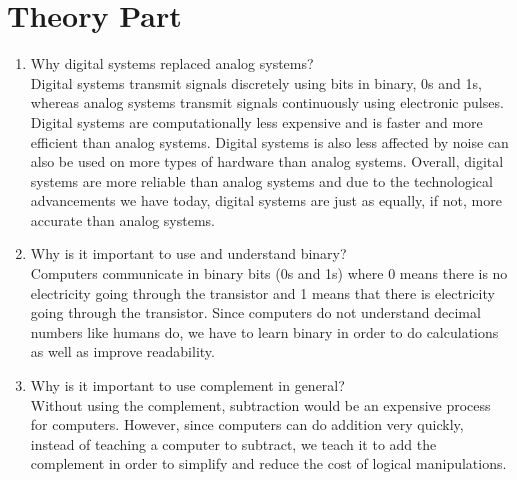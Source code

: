 \documentclass[12pt]{book}
\begin{document}
\newcommand{\reporttitle}{Assignment 1}
\newcommand{\reportauthorOne}{Kien Do}
\newcommand{\cidOne}{300163370}






\section*{Theory Part}

\begin{enumerate}

\item Why digital systems replaced analog systems?\\

Digital systems transmit signals discretely using bits in binary, 0s and 1s, whereas analog systems transmit signals continuously using electronic pulses. Digital systems are computationally less expensive and is faster and more efficient than analog systems. Digital systems is also less affected by noise can also be used on more types of hardware than analog systems. Overall, digital systems are more reliable than analog systems and due to the technological advancements we have today, digital systems are just as equally, if not, more accurate than analog systems.\\


\item Why is it important to use and understand binary?\\

Computers communicate in binary bits (0s and 1s) where 0 means there is no electricity going through the transistor and 1 means that there is electricity going through the transistor. Since computers do not understand decimal numbers like humans do, we have to learn binary in order to do calculations as well as improve readability.\\

\item Why is it important to use complement in general?\\

Without using the complement, subtraction would be an expensive process for computers. However, since computers can do addition very quickly, instead of teaching a computer to subtract, we teach it to add the complement in order to simplify and reduce the cost of logical manipulations.\\

\newpage

\end{enumerate}
\end{document}
